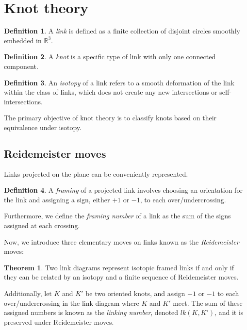\documentclass[11pt]{article}
\theoremstyle{definition}
\newtheorem{theo}{Theorem}[section]
\newtheorem{Def}{Definition}[section]
\begin{document}
\section[\Large \textbf{Knot theory}]{\Large \textbf{Knot theory \cite{Alexander1923,chaoticknots,Williams1998}}}

\begin{Def} A \textit{link} is defined as a finite collection of disjoint circles smoothly embedded in $\mathbb{R}^3$.
\end{Def}
\begin{Def} A \textit{knot} is a specific type of link with only one connected component.
\end{Def}
\begin{Def} An \textit{isotopy} of a link refers to a smooth deformation of the link within the class of links, which does not create any new intersections or self-intersections.
\end{Def}
The primary objective of knot theory is to classify knots based on their equivalence under isotopy.

\subsection{\Large \textbf{Reidemeister moves}} 


Links projected on the plane can be conveniently represented.

\begin{Def}
A \textit{framing} of a projected link involves choosing an orientation for the link and assigning a sign, either \(+1\) or \(-1\), to each over/undercrossing.
\end{Def}

Furthermore, we define the \textit{framing number} of a link as the sum of the signs assigned at each crossing.

Now, we introduce three elementary moves on links known as the \textit{Reidemeister} moves:

\begin{theo}
Two link diagrams represent isotopic framed links if and only if they can be related by an isotopy and a finite sequence of Reidemeister moves.
\end{theo}

Additionally, let \(K\) and \(K'\) be two oriented knots, and assign \(+1\) or \(-1\) to each over/undercrossing in the link diagram where \(K\) and \(K'\) meet. The sum of these assigned numbers is known as the \textit{linking number}, denoted \(lk(K,K')\), and it is preserved under Reidemeister moves.
\end{document}
